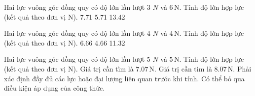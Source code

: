 

\begin{ex}
Hai lực vuông góc đồng quy có độ lớn lần lượt 3 $N$ và $6\,\text{N}$. Tính độ lớn hợp lực (kết quả theo đơn vị N).
\choice
{}
{7.71}
{5.71}
{13.42}
\end{ex}

\begin{ex}
Hai lực vuông góc đồng quy có độ lớn lần lượt 4 $N$ và $4\,\text{N}$. Tính độ lớn hợp lực (kết quả theo đơn vị N).
\choice
{6.66}
{}
{4.66}
{11.32}
\end{ex}

\begin{ex}
Hai lực vuông góc đồng quy có độ lớn lần lượt 5 $N$ và $5\,\text{N}$. Tính độ lớn hợp lực (kết quả theo đơn vị N).
\choiceTF
{\True Giá trị cần tìm là $7.07\,\text{N}$.}
{Giá trị cần tìm là $8.07\,\text{N}$.}
{\True Phải xác định đầy đủ các lực hoặc đại lượng liên quan trước khi tính.}
{Có thể bỏ qua điều kiện áp dụng của công thức.}
\end{ex}

